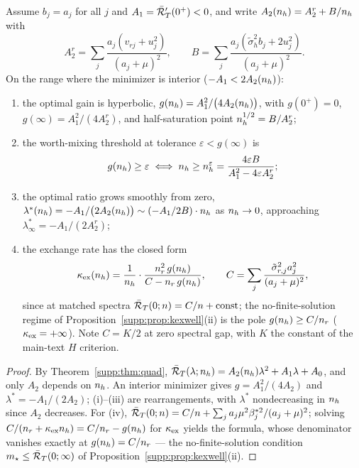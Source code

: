 \begin{theorem}\label{supp:thm:dosage}
Assume $b_j = a_j$ for all $j$ and $A_1 = \bar{\mathcal{R}}_T'(0^+) < 0$, and write $A_2(n_h) = A_2^r + B/n_h$ with
\begin{equation}
A_2^r = \sum_j \frac{a_j (v_{rj} + u_j^2)}{(a_j+\mu)^2},
\qquad
B = \sum_j \frac{a_j (\tilde\sigma_h^2 b_j + 2u_j^2)}{(a_j+\mu)^2}.
\end{equation}
On the range where the minimizer is interior ($-A_1 < 2A_2(n_h)$):
\begin{enumerate}
\item[(i)] the optimal gain is hyperbolic,
$g(n_h) = A_1^2 / \big(4A_2(n_h)\big)$, with $g(0^+) = 0$, $g(\infty) = A_1^2/(4A_2^r)$, and half-saturation point $n_h^{1/2} = B/A_2^r$;
\item[(ii)] the worth-mixing threshold at tolerance $\varepsilon < g(\infty)$ is
\begin{equation}
g(n_h) \ge \varepsilon \iff n_h \ge n_h^\varepsilon = \frac{4\varepsilon B}{A_1^2 - 4\varepsilon A_2^r};
\end{equation}
\item[(iii)] the optimal ratio grows smoothly from zero,
$\lambda^*(n_h) = -A_1/\big(2A_2(n_h)\big) \sim (-A_1/2B)\cdot n_h$ as $n_h \to 0$, approaching $\lambda^*_\infty = -A_1/(2A_2^r)$;
\item[(iv)] the exchange rate has the closed form
\begin{equation}
\kappa_{\mathrm{ex}}(n_h) = \frac{1}{n_h}\cdot \frac{n_r^2\, g(n_h)}{C - n_r\, g(n_h)},
\qquad
C = \sum_j \frac{\tilde\sigma_{r,j}^2 a_j^2}{(a_j+\mu)^2},
\end{equation}
since at matched spectra $\bar{\mathcal{R}}_T(0; n) = C/n + \mathrm{const}$; the no-finite-solution regime of Proposition~\ref{supp:prop:kexwell}(ii) is the pole $g(n_h) \ge C/n_r$ ($\kappa_{\mathrm{ex}} = +\infty$).
Note $C = K/2$ at zero spectral gap, with $K$ the constant of the main-text $H$ criterion.
\end{enumerate}
\end{theorem}

\begin{proof}
By Theorem~\ref{supp:thm:quad}, $\bar{\mathcal{R}}_T(\lambda; n_h) = A_2(n_h)\lambda^2 + A_1\lambda + A_0$, and only $A_2$ depends on $n_h$.
An interior minimizer gives $g = A_1^2/(4A_2)$ and $\lambda^* = -A_1/(2A_2)$; (i)--(iii) are rearrangements, with $\lambda^*$ nondecreasing in $n_h$ since $A_2$ decreases.
For (iv), $\bar{\mathcal{R}}_T(0; n) = C/n + \sum_j a_j \mu^2\beta_j^{*2}/(a_j+\mu)^2$; solving $C/(n_r + \kappa_{\mathrm{ex}}n_h) = C/n_r - g(n_h)$ for $\kappa_{\mathrm{ex}}$ yields the formula, whose denominator vanishes exactly at $g(n_h) = C/n_r$ --- the no-finite-solution condition $m_\star \le \bar{\mathcal{R}}_T(0;\infty)$ of Proposition~\ref{supp:prop:kexwell}(ii).
\end{proof}

